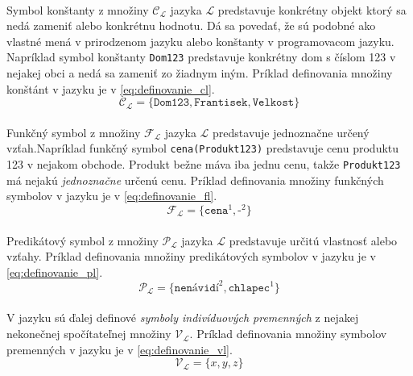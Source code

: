 \paragraph{}
Symbol konštanty z množiny $\mathcal{C}_\mathcal{L}$ jazyka $\mathcal{L}$ predstavuje konkrétny objekt ktorý sa nedá zameniť alebo konkrétnu hodnotu. Dá sa povedať, že sú podobné ako vlastné mená v prirodzenom jazyku alebo konštanty v programovacom jazyku. Napríklad symbol konštanty \texttt{Dom123} predstavuje konkrétny dom s číslom 123 v nejakej obci a nedá sa zameniť zo žiadnym iným. Príklad definovania množiny konštánt v jazyku je v \ref{eq:definovanie_cl}.
\begin{equation} \label{eq:definovanie_cl}
\mathcal{C}_\mathcal{L} = \{\texttt{Dom123}, \texttt{Frantisek}, \texttt{Velkost}\}
\end{equation}

\paragraph{}
Funkčný symbol z množiny $\mathcal{F}_\mathcal{L}$ jazyka $\mathcal{L}$ predstavuje jednoznačne určený vzťah.Napríklad funkčný symbol \texttt{cena(Produkt123)} predstavuje cenu produktu 123 v nejakom obchode. Produkt bežne máva iba jednu cenu, takže \texttt{Produkt123} má nejakú \emph{jednoznačne} určenú cenu. Príklad definovania množiny funkčných symbolov v jazyku je v \ref{eq:definovanie_fl}.
\begin{equation} \label{eq:definovanie_fl}
\mathcal{F}_\mathcal{L} = \{\texttt{cena}^1, \texttt{-}^2\}
\end{equation}

\paragraph{}
Predikátový symbol z množiny $\mathcal{P}_\mathcal{L}$ jazyka $\mathcal{L}$ predstavuje určitú vlastnosť alebo vzťahy. Príklad definovania množiny predikátových symbolov v jazyku je v \ref{eq:definovanie_pl}.
\begin{equation} \label{eq:definovanie_pl}
\mathcal{P}_\mathcal{L} = \{\texttt{nenávidí}^2, \texttt{chlapec}^1\}
\end{equation}

\paragraph{}
V jazyku sú ďalej definové \emph{symboly indivíduových premenných} z nejakej nekonečnej spočítateľnej množiny $\mathcal{V}_\mathcal{L}$. Príklad definovania množiny symbolov premenných v jazyku je v \ref{eq:definovanie_vl}.
\begin{equation} \label{eq:definovanie_vl}
\mathcal{V}_\mathcal{L} = \{x, y, z\}
\end{equation}

